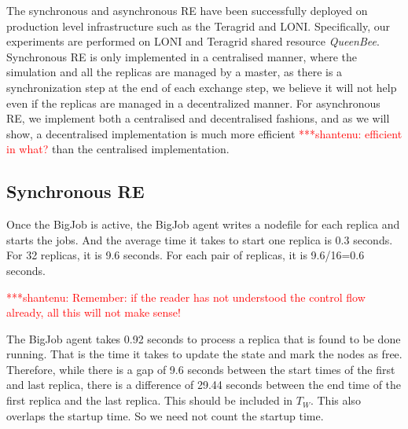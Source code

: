 \documentclass{rspublic}
\newcommand{\jhanote}[1]{ {\textcolor{red} { ***shantenu: #1 }}}
\newcommand{\jhanote}[1]{}
\begin{document}
The synchronous and asynchronous RE have been successfully deployed on
production level infrastructure such as the Teragrid and LONI.
Specifically, our experiments are performed on LONI and Teragrid
shared resource \emph{QueenBee}.  Synchronous RE is only implemented
in a centralised manner, where the simulation and all the replicas are
managed by a master, as there is a synchronization step at the end of
each exchange step, we believe it will not help even if the replicas
are managed in a decentralized manner.  For asynchronous RE, we
implement both a centralised and decentralised fashions, and as we
will show, a decentralised implementation is much more efficient
\jhanote{efficient in what?}  than the centralised implementation.




\subsection{Synchronous RE}


Once the BigJob is active, the BigJob agent writes a
nodefile for each replica and starts the jobs. And the average time
it takes to start one replica is 0.3 seconds. For 32 replicas, it is
9.6 seconds. For each pair of replicas, it is 9.6/16=0.6 seconds.

\jhanote{Remember: if the reader has not understood the control flow
  already, all this will not make sense!}

The BigJob agent takes 0.92 seconds to process a replica that is found to be done running.
That is the time it takes to update the state and mark the nodes as free. Therefore, while there is a gap of 9.6 seconds between the
start times of the first and last replica, there is a difference of
29.44 seconds between the end time of the first replica and the last
replica. This should be included in $T_W$. This also overlaps the
startup time. So we need not count the startup time.
\end{document}
